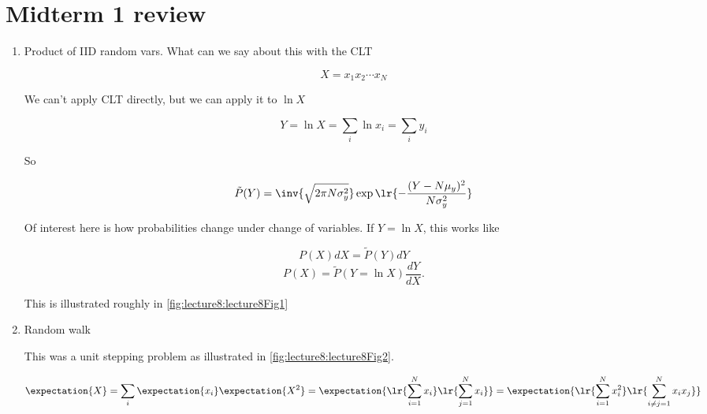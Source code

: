 \chapter{Midterm 1 review}

\begin{enumerate}
\item Product of IID random vars.  What can we say about this with the CLT

\begin{equation}\label{eqn:basicStatMechLecture8:20}
X = x_1 x_2 \cdots x_N
\end{equation}

We can't apply CLT directly, but we can apply it to $\ln X$

\begin{equation}\label{eqn:basicStatMechLecture8:40}
Y = \ln X = \sum_i \ln x_i = \sum_i y_i
\end{equation}

So

\begin{equation}\label{eqn:basicStatMechLecture8:60}
\tilde{P}(Y) = \inv{\sqrt{ 2 \pi N \sigma_y^2}} \exp
\lr{
-\frac{(Y - N \mu_y)^2}{N \sigma_y^2}
}
\end{equation}

Of interest here is how probabilities change under change of variables.  If $Y = \ln X$, this works like

\begin{equation}\label{eqn:basicStatMechLecture8:80}
P(X) dX = \tilde{P}(Y) dY
\end{equation}
\begin{equation}\label{eqn:basicStatMechLecture8:100}
P(X) = \tilde{P}(Y = \ln X) \frac{dY}{dX}.
\end{equation}

This is illustrated roughly in \cref{fig:lecture8:lecture8Fig1}


\item Random walk

This was a unit stepping problem as illustrated in \cref{fig:lecture8:lecture8Fig2}.


\begin{dmath}\label{eqn:basicStatMechLecture8:120}
\expectation{X} = \sum_i \expectation{x_i}
\expectation{X^2} = 
\expectation{
\lr{\sum_{i = 1}^N x_i}
\lr{\sum_{j = 1}^N x_i}
}
= 
\expectation{
\lr{\sum_{i = 1}^N x_i^2}
\lr{\sum_{i \ne j = 1}^N x_i x_j}
}
\end{dmath}


\end{enumerate}
